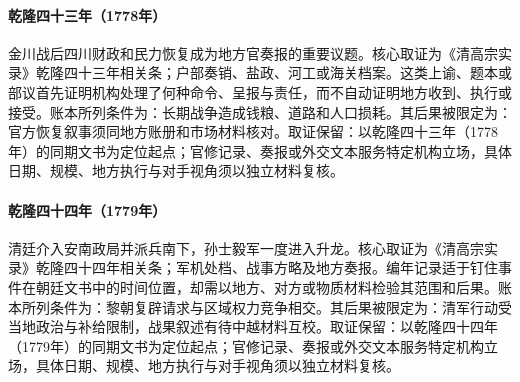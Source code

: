 \hypertarget{ledger:EQ-1778-SICHUAN-TAX-RECOVERY}{}\paragraph{乾隆四十三年（1778年）}金川战后四川财政和民力恢复成为地方官奏报的重要议题。核心取证为《清高宗实录》乾隆四十三年相关条；户部奏销、盐政、河工或海关档案。这类上谕、题本或部议首先证明机构处理了何种命令、呈报与责任，而不自动证明地方收到、执行或接受。账本所列条件为：长期战争造成钱粮、道路和人口损耗。其后果被限定为：官方恢复叙事须同地方账册和市场材料核对。取证保留：以乾隆四十三年（1778年）的同期文书为定位起点；官修记录、奏报或外交文本服务特定机构立场，具体日期、规模、地方执行与对手视角须以独立材料复核。
\hypertarget{ledger:EQ-1779-VIETNAM-INTERVENTION}{}\paragraph{乾隆四十四年（1779年）}清廷介入安南政局并派兵南下，孙士毅军一度进入升龙。核心取证为《清高宗实录》乾隆四十四年相关条；军机处档、战事方略及地方奏报。编年记录适于钉住事件在朝廷文书中的时间位置，却需以地方、对方或物质材料检验其范围和后果。账本所列条件为：黎朝复辟请求与区域权力竞争相交。其后果被限定为：清军行动受当地政治与补给限制，战果叙述有待中越材料互校。取证保留：以乾隆四十四年（1779年）的同期文书为定位起点；官修记录、奏报或外交文本服务特定机构立场，具体日期、规模、地方执行与对手视角须以独立材料复核。
